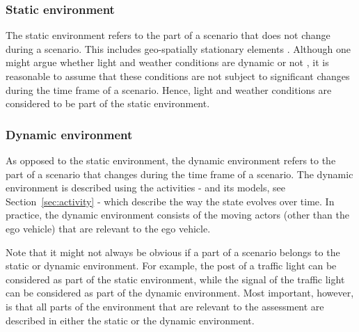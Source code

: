\subsubsection{Static environment}
\label{sec:static environment}
The static environment refers to the part of a scenario that does not change during a scenario. This includes geo-spatially stationary elements \cite{ulbrich2015}. Although one might argue whether light and weather conditions are dynamic or not \cite{geyer2014,bach2016modelbased}, it is reasonable to assume that these conditions are not subject to significant changes during the time frame of a scenario. Hence, light and weather conditions are considered to be part of the static environment.

\subsubsection{Dynamic environment}
\label{sec:dynamic environment}
As opposed to the static environment, the dynamic environment refers to the part of a scenario that changes during the time frame of a scenario. The dynamic environment is described using the activities - and its models, see Section~\ref{sec:activity} - which describe the way the state evolves over time. In practice, the dynamic environment consists of the moving actors (other than the ego vehicle) that are relevant to the ego vehicle.

Note that it might not always be obvious if a part of a scenario belongs to the static or dynamic environment. For example, the post of a traffic light can be considered as part of the static environment, while the signal of the traffic light can be considered as part of the dynamic environment. Most important, however, is that all parts of the environment that are relevant to the assessment are described in either the static or the dynamic environment.
